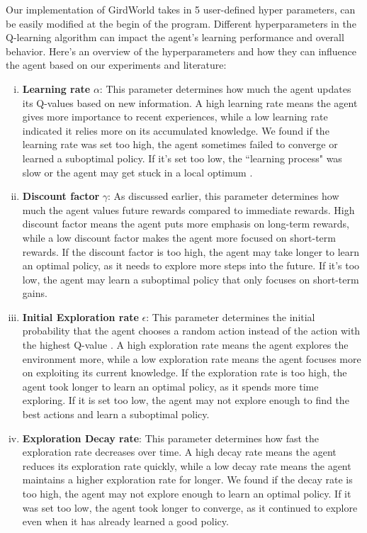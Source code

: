 Our implementation of GirdWorld takes in 5 user-defined hyper parameters, can be easily modified at the begin of the program. Different hyperparameters in the Q-learning algorithm can impact the agent's learning performance and overall behavior. Here's an overview of the hyperparameters and how they can influence the agent based on our experiments and literature:
\begin{enumerate}[(i)]
    \item \textbf{Learning rate} $\alpha$: This parameter determines how much the agent updates its Q-values based on new information. A high learning rate means the agent gives more importance to recent experiences, while a low learning rate indicated it relies more on its accumulated knowledge. We found if the learning rate was set too high, the agent sometimes failed to converge or learned a suboptimal policy. If it's set too low, the ``learning process"  was slow or the agent may get stuck in a local optimum .

    \item \textbf{Discount factor} $\gamma$: As discussed earlier, this parameter determines how much the agent values future rewards compared to immediate rewards. High discount factor means the agent puts more emphasis on long-term rewards, while a low discount factor makes the agent more focused on short-term rewards. If the discount factor is too high, the agent may take longer to learn an optimal policy, as it needs to explore more steps into the future. If it's too low, the agent may learn a suboptimal policy that only focuses on short-term gains.
    
    \item \textbf{Initial Exploration rate} $\epsilon$: This parameter determines the initial probability that the agent chooses a random action instead of the action with the highest Q-value \cite{RL}. A high exploration rate means the agent explores the environment more, while a low exploration rate means the agent focuses more on exploiting its current knowledge. If the exploration rate is too high, the agent took longer to learn an optimal policy, as it spends more time exploring. If it is set too low, the agent may not explore enough to find the best actions and learn a suboptimal policy.

    \item \textbf{Exploration Decay rate}: This parameter determines how fast the exploration rate decreases over time. A high decay rate means the agent reduces its exploration rate quickly, while a low decay rate means the agent maintains a higher exploration rate for longer. We found if the decay rate is too high, the agent may not explore enough to learn an optimal policy. If it was set too low, the agent took longer to converge, as it continued to explore even when it has already learned a good policy.


\end{enumerate}
